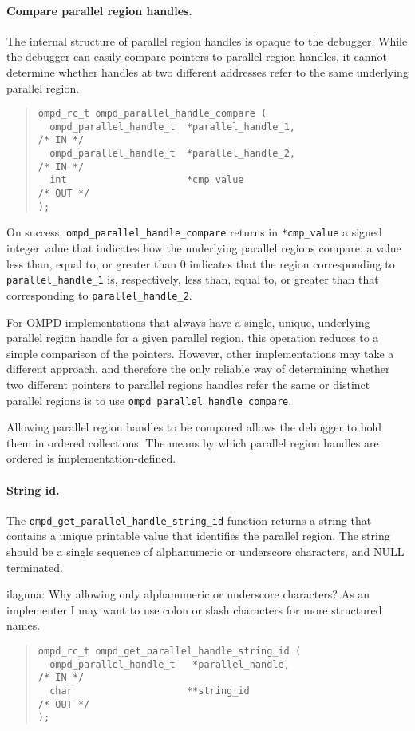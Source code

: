 \paragraph{Compare parallel region handles.}
The internal structure of parallel region handles is opaque to the debugger.
While the debugger can easily compare pointers to parallel region handles,
it cannot determine whether handles at two different addresses refer to the
same underlying parallel region.
\begin{quote}
\begin{lstlisting}
ompd_rc_t ompd_parallel_handle_compare (
  ompd_parallel_handle_t  *parallel_handle_1,                       /* IN */
  ompd_parallel_handle_t  *parallel_handle_2,                       /* IN */
  int                     *cmp_value                               /* OUT */
);
\end{lstlisting}
\end{quote}
On success, \texttt{ompd\_parallel\_handle\_compare} returns in
\texttt{*cmp\_value} a signed integer value that indicates how
the underlying parallel regions compare:
a value less than, equal to, or greater than 0 indicates that
the region corresponding to \texttt{parallel\_handle\_1} is,
respectively, less than, equal to, or greater than that corresponding
to \texttt{parallel\_handle\_2}.

For OMPD implementations that always have a single, unique, underlying
parallel region handle for a given parallel region,
this operation reduces to a simple comparison of the pointers.
However, other implementations may take a different approach,
and therefore the only reliable way of determining whether two different
pointers to parallel regions handles refer the same or distinct
parallel regions is to use \texttt{ompd\_parallel\_handle\_compare}.

Allowing parallel region handles to be compared allows the debugger to hold
them in ordered collections.
The means by which parallel region handles are ordered is
implementation-defined.

\paragraph{String id.}
The \texttt{ompd\_get\_parallel\_handle\_string\_id}
function returns a string that contains a unique printable
value that identifies the parallel region.
The string should be a single sequence of alphanumeric or underscore
characters, and NULL terminated.
\begin{notes}
	ilaguna: Why allowing only alphanumeric or underscore characters? As an 
	implementer I may want to use colon or slash characters for more structured 
	names.
\end{notes}
\begin{quote}
\begin{lstlisting}
ompd_rc_t ompd_get_parallel_handle_string_id (
  ompd_parallel_handle_t   *parallel_handle,                        /* IN */
  char                    **string_id                              /* OUT */
);
\end{lstlisting}
\end{quote}

